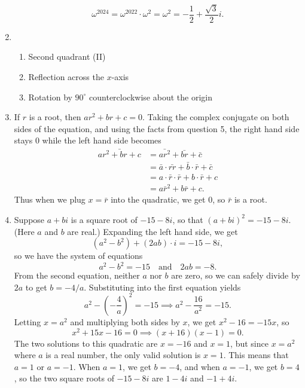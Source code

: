 \begin{enumerate}
\begin{equation*}
\omega^{2024} = \omega^{2022}\cdot\omega^2 = \omega^2 = \boxed{-\frac{1}{2} + \frac{\sqrt{3}}{2}i}.
\end{equation*}
\item \begin{enumerate}
\item Second quadrant (II)
\item Reflection across the $x$-axis
\item Rotation by $90^{\circ}$ counterclockwise about the origin
\end{enumerate}
\item If $r$ is a root, then $ar^2 + br + c = 0$. Taking the complex conjugate on both sides of the equation, and using the facts from question 5, the right hand side stays $0$ while the left hand side becomes
\begin{align*}
\bar{ar^2 + br + c} &= \bar{ar^2} + \bar{br} + \bar{c} \\
&= \bar{a}\cdot\bar{rr} + \bar{b}\cdot\bar{r} + \bar{c} \\
&= a\cdot\bar{r}\cdot\bar{r} + b\cdot\bar{r} + c \tag{$a,b,c$ real} \\
&= a\bar{r}^2 + b\bar{r} + c.
\end{align*}
Thus when we plug $x = \bar{r}$ into the quadratic, we get $0$, so $\bar{r}$ is a root.
\item Suppose $a + bi$ is a square root of $-15 - 8i$, so that $(a + bi)^2 = -15 - 8i$. (Here $a$ and $b$ are real.) Expanding the left hand side, we get
\begin{equation*}
(a^2 - b^2) + (2ab)\cdot i = -15 - 8i,
\end{equation*}
so we have the system of equations
\begin{equation*}
a^2 - b^2 = -15\quad\text{and}\quad 2ab = -8.
\end{equation*}
From the second equation, neither $a$ nor $b$ are zero, so we can safely divide by $2a$ to get $b = -4/a$. Substituting into the first equation yields
\begin{equation*}
a^2 - \left(-\frac{4}{a}\right)^2 = -15\implies a^2 - \frac{16}{a^2} = -15.
\end{equation*}
Letting $x = a^2$ and multiplying both sides by $x$, we get $x^2 - 16 = -15x$, so 
\begin{equation*}
x^2 + 15x - 16 = 0\implies (x + 16)(x - 1) = 0.
\end{equation*}
The two solutions to this quadratic are $x = -16$ and $x = 1$, but since $x = a^2$ where $a$ is a real number, the only valid solution is $x = 1$. This means that $a = 1$ or $a = -1$. When $a = 1$, we get $b = -4$, and when $a = -1$, we get $b = 4$, so the two square roots of $-15 - 8i$ are $\boxed{1 - 4i}$ and $\boxed{-1 + 4i}$.
\end{enumerate}